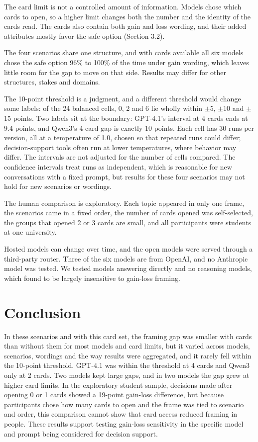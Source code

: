 \documentclass[11pt]{article}
\begin{document}
The card limit is not a controlled amount of information. Models chose which cards to open, so a higher limit changes both the number and the identity of the cards read. The cards also contain both gain and loss wording, and their added attributes mostly favor the safe option (Section 3.2).

The four scenarios share one structure, and with cards available all six models chose the safe option 96\% to 100\% of the time under gain wording, which leaves little room for the gap to move on that side. Results may differ for other structures, stakes and domains.

The 10-point threshold is a judgment, and a different threshold would change some labels: of the 24 balanced cells, 0, 2 and 6 lie wholly within $\pm$5, $\pm$10 and $\pm$15 points. Two labels sit at the boundary: GPT-4.1's interval at 4 cards ends at 9.4 points, and Qwen3's 4-card gap is exactly 10 points. Each cell has 30 runs per version, all at a temperature of 1.0, chosen so that repeated runs could differ; decision-support tools often run at lower temperatures, where behavior may differ. The intervals are not adjusted for the number of cells compared. The confidence intervals treat runs as independent, which is reasonable for new conversations with a fixed prompt, but results for these four scenarios may not hold for new scenarios or wordings.

The human comparison is exploratory. Each topic appeared in only one frame, the scenarios came in a fixed order, the number of cards opened was self-selected, the groups that opened 2 or 3 cards are small, and all participants were students at one university.

Hosted models can change over time, and the open models were served through a third-party router. Three of the six models are from OpenAI, and no Anthropic model was tested. We tested models answering directly and no reasoning models, which \citet{ge2026mind} found to be largely insensitive to gain-loss framing.

\section{Conclusion}

In these scenarios and with this card set, the framing gap was smaller with cards than without them for most models and card limits, but it varied across models, scenarios, wordings and the way results were aggregated, and it rarely fell within the 10-point threshold. GPT-4.1 was within the threshold at 4 cards and Qwen3 only at 2 cards. Two models kept large gaps, and in two models the gap grew at higher card limits. In the exploratory student sample, decisions made after opening 0 or 1 cards showed a 19-point gain-loss difference, but because participants chose how many cards to open and the frame was tied to scenario and order, this comparison cannot show that card access reduced framing in people. These results support testing gain-loss sensitivity in the specific model and prompt being considered for decision support.
\end{document}
